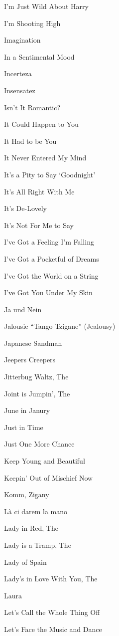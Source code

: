 \N I'm Just Wild About Harry

\N I'm Shooting High

\N Imagination

\N In a Sentimental Mood

\N Incerteza

\N Insensatez

\N Isn't It Romantic?

\N {}

\N It Could Happen to You

\N It Had to be You

\N It Never Entered My Mind

\N It's a Pity to Say `Goodnight'

\N It's All Right With Me

\N It's De-Lovely

\N It's Not For Me to Say

\N I've Got a Feeling I'm Falling

\N I've Got a Pocketful of Dreams

\N I've Got the World on a String

\N I've Got You Under My Skin

\N Ja und Nein

\N Jalousie ``Tango Tzigane'' (Jealousy)

\N Japanese Sandman

\N Jeepers Creepers

\N Jitterbug Waltz, The

\N Joint is Jumpin', The

\N June in Janury

\N Just in Time

\N Just One More Chance

\N Keep Young and Beautiful

\N Keepin' Out of Mischief Now

\N Komm, Zigany

\N L{\`a} ci darem la mano

\N Lady in Red, The

\N Lady is a Tramp, The

\N Lady of Spain

\N Lady's in Love With You, The

\N Laura

\N Let's Call the Whole Thing Off

\N Let's Face the Music and Dance

